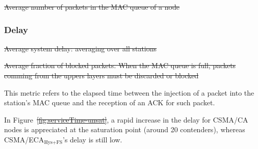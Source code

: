 \documentclass[a4paper,journal]{IEEEtran}
\providecommand{\DIFaddtex}[1]{{\protect\color{blue}\uwave{#1}}} %
\providecommand{\DIFdeltex}[1]{{\protect\color{red}\sout{#1}}}                      %
\providecommand{\DIFaddbegin}{} %
\providecommand{\DIFaddend}{} %
\providecommand{\DIFdelbegin}{} %
\providecommand{\DIFdelend}{} %
\providecommand{\DIFdelFL}[1]{\DIFdel{#1}} %
\providecommand{\DIFadd}[1]{\texorpdfstring{\DIFaddtex{#1}}{#1}} %
\providecommand{\DIFdel}[1]{\texorpdfstring{\DIFdeltex{#1}}{}} %
\begin{document}
	
	\DIFdelbegin %
{%
\DIFdelFL{Average number of packets in the MAC queue of a node}}

\DIFdelend \subsubsection{Delay}

\DIFdelbegin %
{%
\DIFdelFL{Average system delay: averaging over all stations}}
\DIFdelend %

	\DIFdelbegin %
{%
\DIFdelFL{Average fraction of blocked packets. When the MAC queue is full, packets comming from the uppers layers must be discarded or blocked}}

\DIFdelend This metric refers to the elapsed time between the injection of a packet into the station's MAC queue and the reception of an ACK for such packet. 

	In Figure~\DIFdelbegin \DIFdel{\ref{fig:serviceTime-unsat}}\DIFdelend \DIFaddbegin \DIFadd{\ref{fig:unsatResults}e}\DIFaddend , a rapid increase in the delay for CSMA/CA nodes is appreciated at the saturation point (around 20 contenders), whereas CSMA/ECA$_{\text{Hys+FS}}$'s delay is still low. 
\end{document}
